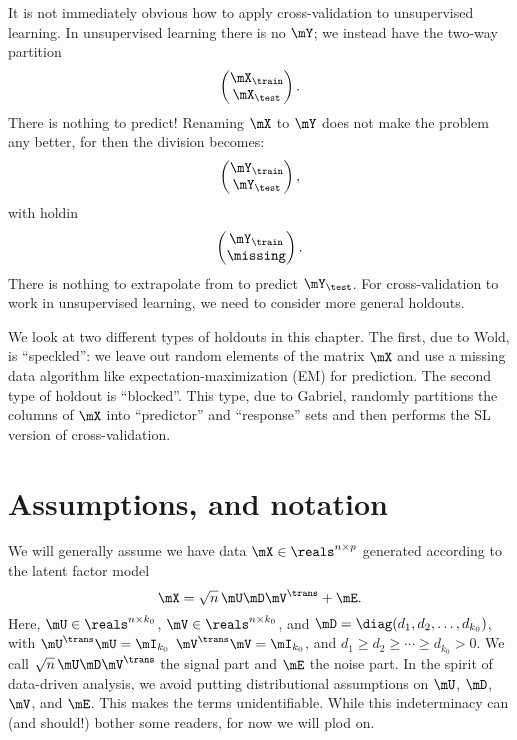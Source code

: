 It is not immediately obvious how to apply cross-validation to unsupervised
learning.  In unsupervised learning there is no $\mY$; we instead have the 
two-way partition
\[
    \left(
    \begin{matrix}
        \mX_\train \\
        \mX_\test
    \end{matrix}
    \right).
\]
There is nothing to predict!  Renaming $\mX$ to $\mY$ does not make the
problem any better, for then the division becomes:
\[
    \left(
    \begin{matrix}
        \mY_\train \\
        \mY_\test
    \end{matrix}
    \right),
\]
with holdin
\[
    \left(
    \begin{matrix}
        \mY_\train \\
        \missing
    \end{matrix}
    \right).
\]
There is nothing to extrapolate from to predict $\mY_\test$.  For 
cross-validation to work in unsupervised learning, we need to consider
more general holdouts.

We look at two different types of holdouts in this chapter. The first, due to
Wold, is ``speckled'': we leave out random elements of the matrix $\mX$ and
use a missing data algorithm like expectation-maximization (EM) for
prediction. The second type of holdout is ``blocked''. This type, due to
Gabriel, randomly partitions the columns of $\mX$ into ``predictor'' and
``response'' sets and then performs the SL version of cross-validation.

\section{Assumptions, and notation}\label{S:ucv-assumptions-notation}

We will generally assume we have data $\mX \in \reals^{n \times p}$
generated according to the latent factor model 
\[
    \mX = \sqrt{n} \, \mU \mD \mV^\trans + \mE.
\]
Here, $\mU \in \reals^{n \times k_0}$, $\mV \in \reals^{n \times k_0}$, and
$\mD = \diag( d_1, d_2, \ldots, d_{k_0} )$, with $\mU^\trans \mU = \mI_{k_0}$
$\mV^\trans \mV = \mI_{k_0}$, and $d_1 \geq d_2 \geq \cdots \geq d_{k_0} > 0$. We call $\sqrt{n} \, \mU \mD \mV^\trans$ the
signal part and $\mE$ the noise part. In the spirit of data-driven analysis,
we avoid putting distributional assumptions on $\mU$, $\mD$, $\mV$, and $\mE$.
This makes the terms unidentifiable.  While this indeterminacy can (and 
should!) bother some readers, for now we will plod on.

